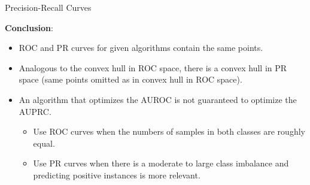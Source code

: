 \begin{vbframe}{Precision-Recall Curves}
% 

\framebreak

\textbf{Conclusion}: \\

\begin{itemize}
  \item ROC and PR curves for given algorithms contain the same points.
  \item Analogous to the convex hull in ROC space, there is a convex hull in PR 
  space (same points omitted as in convex hull in ROC space).
  \item An algorithm that optimizes the AUROC is not guaranteed to optimize
  the AUPRC.
  \begin{itemize}
    \item Use ROC curves when the numbers of samples in both classes are 
    roughly equal.
    \item Use PR curves when there is a moderate to large class
    imbalance and predicting positive instances is more relevant.
  \end{itemize}
\end{itemize}
\end{vbframe}


